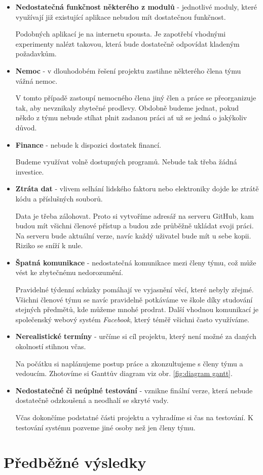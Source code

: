 \documentclass[12pt,a4paper]{article}
\begin{document}
\begin{itemize}
	\item{\textbf{Nedostatečná funkčnost některého z modulů}} - jednotlivé moduly, které využívají již existující aplikace nebudou mít dostatečnou funkčnost.
	
	Podobných aplikací je na internetu spousta. Je zapotřebí vhodnými experimenty nalézt takovou, která bude dostatečně odpovídat kladeným požadavkům.  
	
	\item{\textbf{Nemoc}} - v dlouhodobém řešení projektu zastihne některého člena týmu vážná nemoc. 
	
	V tomto případě zastoupí nemocného člena jiný člen a práce se přeorganizuje tak, aby nevznikaly zbytečné prodlevy. Obdobně budeme jednat, pokud někdo z týmu nebude stíhat plnit zadanou práci ať už se jedná o jakýkoliv důvod. 
	
	\item{\textbf{Finance}} - nebude k dispozici dostatek financí.
	
	Budeme využívat volně dostupných programů. Nebude tak třeba žádná investice.
	
	\item{\textbf{Ztráta dat}} - vlivem selhání lidského faktoru nebo elektroniky dojde ke ztrátě kódu a příslušných souborů.
	
	Data je třeba zálohovat. Proto si vytvoříme adresář na serveru GitHub, kam budou mít všichni členové přístup a budou zde průběžně ukládat svoji práci. Na serveru bude aktuální verze, navíc každý uživatel bude mít u sebe kopii. Riziko se sníží k nule. 
	
	\item{\textbf{Špatná komunikace}} - nedostatečná komunikace mezi členy týmu, což může vést ke zbytečnému nedorozumění. 
	
	Pravidelné týdenní schůzky pomáhají ve vyjasnění věcí, které nebyly zřejmé. Všichni členové týmu se navíc pravidelně potkáváme ve škole díky studování stejných předmětů, kde můžeme mnohé prodrat. Další vhodnou komunikací je společenský webový systém \textit{Facebook}, který téměř všichni často využíváme.
	
	\item{\textbf{Nerealistické termíny}} - určíme si cíl projektu, který není možné za daných okolností stihnou včas.
	
	Na počátku si naplánujeme postup práce a zkonzultujeme s členy týmu a vedoucím. Zhotovíme si Ganttův diagram viz obr. \ref{fig:diagram gantt}.
	
	\item{\textbf{Nedostatečné či neúplné testování}} - vznikne finální verze, která nebude dostatečně odzkoušená a neodhalí se skryté vady.
	
	Včas dokončíme podstatné části projektu a vyhradíme si čas na testování. K testování systému pozveme jiné osoby než jen členy týmu. 
	
	 
	
\end{itemize}



\section*{Předběžné výsledky}


\nocite{*}
\printbibliography 
\end{document}
